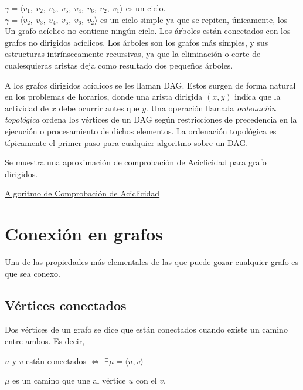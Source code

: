 \quad $\gamma = \langle v_1,\ v_2,\ v_6,\ v_5,\ v_4,\ v_6,\ v_2,\ v_1 \rangle$ es un ciclo.\\

\quad $\gamma = \langle v_2,\ v_3,\ v_4,\ v_5,\ v_6,\ v_2 \rangle$ es un ciclo simple ya que se repiten, únicamente, los \hspace*{.15in}{vértices primero y último.}\\


Un grafo acíclico no contiene ningún ciclo. Los árboles están conectados con los grafos no dirigidos acíclicos. Los árboles son los grafos más simples, y sus estructuras intrínsecamente recursivas, ya que la eliminación o corte de cualesquieras aristas deja como resultado dos pequeños árboles.

A los grafos dirigidos acíclicos se les llaman DAG. Estos surgen de forma natural en los problemas de horarios, donde una arista dirigida $(x,y)$ indica que la actividad de $x$ debe ocurrir antes que $y$. Una operación llamada \emph{ordenación topológica} ordena los vértices de un DAG según restricciones de precedencia en la ejecución o procesamiento de dichos elementos. La ordenación topológica es típicamente el primer paso para cualquier algoritmo sobre un DAG.

\begin{nota}
Se muestra una aproximación de comprobación de Aciclicidad para grafo dirigidos.\\
\end{nota}

\underline{Algoritmo de Comprobación de Aciclicidad}\\


\section{Conexión en grafos}

Una de las propiedades más elementales de las que puede gozar cualquier grafo es que sea conexo.

\subsection{Vértices conectados}

\begin{fondo}
Dos vértices de un grafo se dice que están conectados cuando existe un camino entre ambos. Es decir,
\begin{center}$u$ y $v$ están conectados $\iff$ $\exists \mu = \langle u, v \rangle$ \end{center}
$\mu$ es un camino que une al vértice $u$ con el $v$.
\end{fondo}


